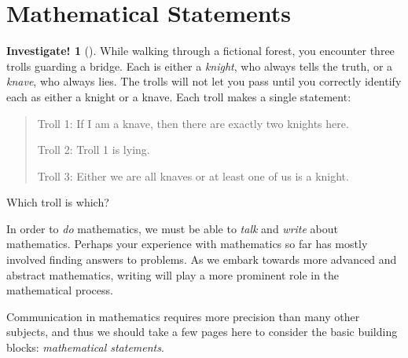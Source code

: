 \documentclass[10pt,]{book}
\theoremstyle{plain}
\theoremstyle{definition}
\theoremstyle{definition}
\theoremstyle{definition}
\newtheorem{investigation}[project]{Investigate!}
\theoremstyle{definition}
\numberwithin{equation}{chapter}
\begin{document}
\section[{Mathematical Statements}]{Mathematical Statements}\label{sec_background-statements}
\begin{investigation}[]\label{investigation-10}
\hypertarget{p-1348}{}%
While walking through a fictional forest, you encounter three trolls guarding a bridge. Each is either a \emph{knight}, who always tells the truth, or a \emph{knave}, who always lies. The trolls will not let you pass until you correctly identify each as either a knight or a knave. Each troll makes a single statement:%
\begin{quote}\hypertarget{blockquote-3}{}
\hypertarget{p-1349}{}%
Troll 1: If I am a knave, then there are exactly two knights here.%
\par
\hypertarget{p-1350}{}%
Troll 2: Troll 1 is lying.%
\par
\hypertarget{p-1351}{}%
Troll 3: Either we are all knaves or at least one of us is a knight.%
\end{quote}
\hypertarget{p-1352}{}%
Which troll is which?  %
\end{investigation}
\hypertarget{p-1353}{}%
In order to \emph{do} mathematics, we must be able to \emph{talk} and \emph{write} about mathematics. Perhaps your experience with mathematics so far has mostly involved finding answers to problems. As we embark towards more advanced and abstract mathematics, writing will play a more prominent role in the mathematical process.%
\par
\hypertarget{p-1354}{}%
Communication in mathematics requires more precision than many other subjects, and thus we should take a few pages here to consider the basic building blocks: \emph{mathematical statements}.%
\typeout{************************************************}
\typeout{************************************************}
\end{document}
